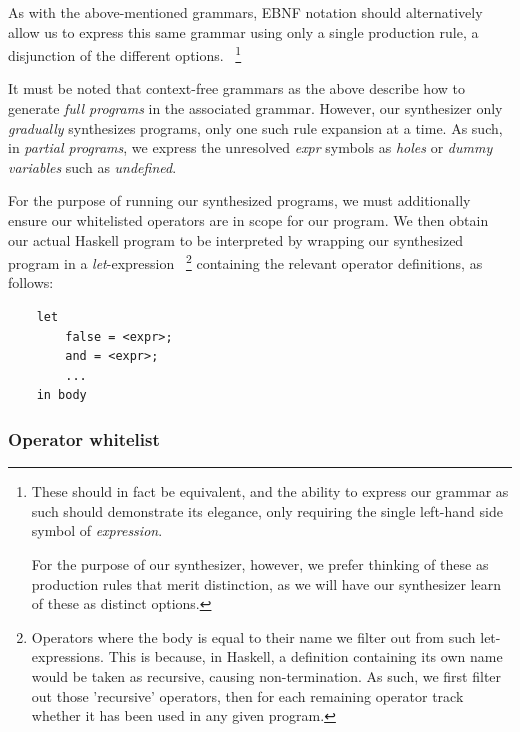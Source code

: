\documentclass{article}
\begin{document}
As with the above-mentioned grammars,
EBNF notation should alternatively allow us to express
this same grammar using only a single production rule,
a disjunction of the different options.%
~\footnote{
    These should in fact be equivalent,
    and the ability to express our grammar as such should demonstrate its elegance,
    only requiring the single left-hand side symbol of \emph{expression}.

    For the purpose of our synthesizer, however,
    we prefer thinking of these as production rules that merit distinction,
    as we will have our synthesizer learn of these as distinct options.
}

It must be noted that context-free grammars
as the above
describe how to generate \emph{full programs} in the associated grammar.
However, our synthesizer only \emph{gradually} synthesizes programs,
only one such rule expansion at a time.
As such, in \emph{partial programs},
we express the unresolved \emph{expr} symbols as
\emph{holes} or \emph{dummy variables} such as \emph{undefined}.

For the purpose of running our synthesized programs,
we must additionally ensure our whitelisted operators are in scope for our program.
We then obtain our actual Haskell program to be interpreted
by wrapping our synthesized program in a \emph{let}-expression%
~\footnote{
    Operators where the body is equal to their name we filter out from such let-expressions.
    This is because, in Haskell,
    a definition containing its own name would be taken as recursive,
    causing non-termination.
    As such, we first filter out those 'recursive' operators,
    then for each remaining operator track
    whether it has been used in any given program.
}
containing the relevant operator definitions, as follows:

\begin{verbatim}
    let
        false = <expr>;
        and = <expr>;
        ...
    in body
\end{verbatim}

\subsubsection{Operator whitelist}
\end{document}
